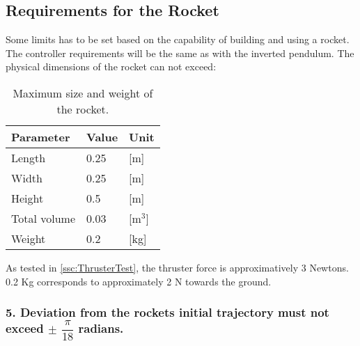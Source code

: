 \subsection{Requirements for the Rocket}
Some limits has to be set based on the capability of building and using a rocket. The controller requirements will be the same as with the inverted pendulum.  
The physical dimensions of the rocket can not exceed:
\begin{table}[htbp]
\centering\begin{flushleft}
	\begin{flushleft}
		\begin{flushleft}
			\begin{flushleft}
				\begin{flushleft}
					\begin{flushleft}
						\begin{flushleft}
							\begin{flushleft}
								
							\end{flushleft}
						\end{flushleft}
					\end{flushleft}
				\end{flushleft}
			\end{flushleft}
		\end{flushleft}
	\end{flushleft}
\end{flushleft}
\begin{tabular}{lll}
\hline
Parameter    & Value & Unit  \\ \hline
Length       & 0.25  & [m]     \\
Width        & 0.25  & [m]     \\
Height       & 0.5   & [m]     \\
Total volume & 0.03  & [m$^3$] \\
Weight       & 0.2   & [kg]   
\end{tabular}

\caption{Maximum size and weight of the rocket.}
\label{RocketDimensions}
\end{table}

As tested in \autoref{ssc:ThrusterTest}, the thruster force is approximatively 3 Newtons. 0.2 Kg corresponds to approximately 2 N towards the ground.

\subsubsection*{5. Deviation from the rockets initial trajectory must not exceed $\pm$ $\dfrac{\pi}{18}$ radians.} 

